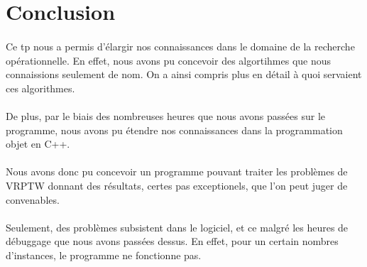 \documentclass[12pt]{article}
\begin{document}
\clearpage
\section{Conclusion}

\paragraph{}
Ce tp nous a permis d'élargir nos connaissances dans le domaine de la recherche opérationnelle. En effet, nous avons pu concevoir des algortihmes que nous 
connaissions seulement de nom. On a ainsi compris plus en détail à quoi servaient ces algorithmes.

\paragraph{}
De plus, par le biais des nombreuses heures que nous avons passées sur le programme, nous avons pu étendre nos connaissances dans la programmation objet en C++.

\paragraph{}
Nous avons donc pu concevoir un programme pouvant traiter les problèmes de VRPTW donnant des résultats, certes pas exceptionels, que l'on peut juger de convenables.

\paragraph{}
Seulement, des problèmes subsistent dans le logiciel, et ce malgré les heures de débuggage que nous avons passées dessus. En effet, pour un 
certain nombres d'instances, le programme ne fonctionne pas. 
\end{document}
